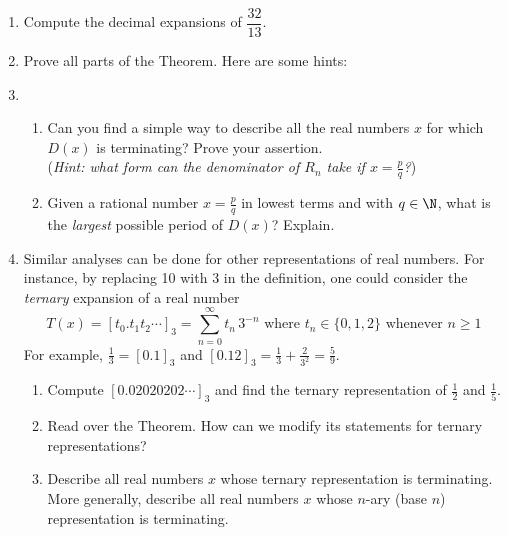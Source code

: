 \begin{enumerate}
  \item Compute the decimal expansions of $\dfrac{32}{13}$.
  \item Prove all parts of the Theorem. Here are some hints:
	\item\begin{enumerate}
	  \item Can you find a simple way to describe all the real numbers $x$ for which $D(x)$ is terminating? Prove your assertion.\\
	  (\emph{Hint: what form can the denominator of $R_n$ take if $x=\frac pq$?})
	  \item Given a rational number $x=\frac pq$ in lowest terms and with $q\in\N$, what is the \emph{largest} possible period of $D(x)$? Explain.
	\end{enumerate}
	\item Similar analyses can be done for other representations of real numbers. For instance, by replacing 10 with 3 in the definition, one could consider the \emph{ternary} expansion of a real number
	\[T(x)=[t_0.t_1t_2\cdots]_3=\sum_{n=0}^\infty t_n\,3^{-n}\text{ where }t_n\in\{0,1,2\}\text{ whenever }n\ge 1\]
	For example, $\frac 13=[0.1]_3$ and $[0.12]_3=\frac 13+\frac 2{3^2}=\frac 59$.
	\begin{enumerate}
  	\item Compute $[0.02020202\cdots]_3$ and find the ternary representation of $\frac 12$ and $\frac 15$.
  	\item Read over the Theorem. How can we modify its statements for ternary representations?
  	\item Describe all real numbers $x$ whose ternary representation is terminating. More generally, describe all real numbers $x$ whose $n$-ary (base $n$) representation is terminating. 
	\end{enumerate}
\end{enumerate}

